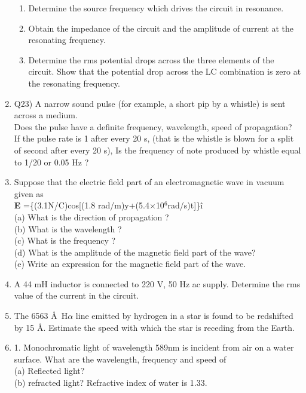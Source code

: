 \begin{enumerate}[label=\thesection.\arabic*,ref=\thesection.\theenumi]
\begin{enumerate}
    \item Determine the source frequency which drives the circuit in resonance.
    \item Obtain the impedance of the circuit and the amplitude of current
at the resonating frequency.
    \item Determine the rms potential drops across the three elements of
the circuit. Show that the potential drop across the LC
combination is zero at the resonating frequency.\\
\end{enumerate}
\solution
\pagebreak

\item Q23) A narrow sound pulse (for example, a short pip by a whistle) is sent across a
	medium.\\  Does the pulse have a definite  frequency,  wavelength,  speed
	of propagation?\\[1ex] If the pulse rate is 1 after every 20 s, (that is the whistle is
	blown for a split of second after every 20 s), Is the frequency of note produced
	by whistle equal to 1/20 or 0.05 Hz ?\\
\solution
\pagebreak
\item Suppose that the electric field part of an electromagnetic wave in vacuum given as\\ \textbf{E} =\{(3.1N/C)cos[(1.8 rad/m)y+(5.4$\times$10$^{6}$rad/s)t]\}\^i \\
(a) What is the direction of propagation ?\\
(b) What is the wavelength ? \\
(c) What is the frequency ?\\
(d) What is the amplitude of the magnetic field part of the wave?\\
(e) Write an expression for the magnetic field part of the wave.\\
\solution
\pagebreak

\item A 44 mH inductor is connected to 220 V, 50 Hz ac supply. Determine
the rms value of the current in the circuit.\\
\solution
\pagebreak

\item The 6563 \AA\, H$\alpha$ line emitted by hydrogen in a star is found to be redshifted by 15 \AA. Estimate the speed with which the star is receding from the Earth.
\solution
\pagebreak
\item 1. Monochromatic light of wavelength 589nm is incident from air on a
water surface. What are the wavelength, frequency and speed of\\
(a) Reflected light?\\
(b) refracted light? Refractive index of water is 1.33.\\
\solution

\end{enumerate}
